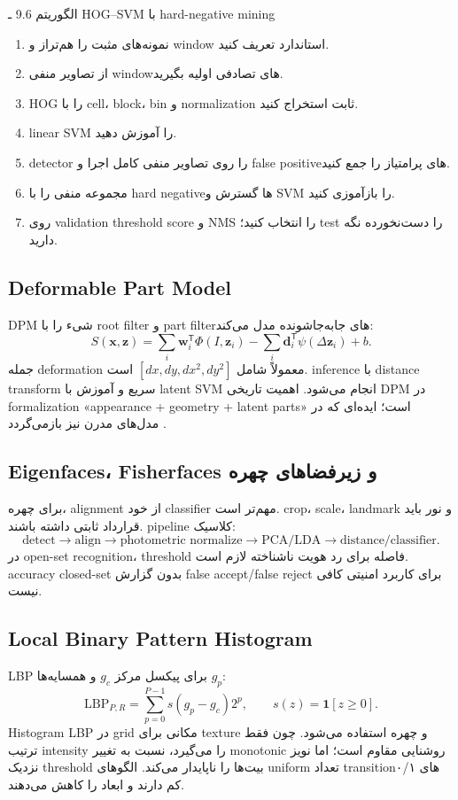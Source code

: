 \documentclass[12pt,openany,oneside]{book}
\newcommand{\trans}{^{\mathsf T}}
\newcommand{\vect}[1]{\bm{#1}}
\begin{document}
\begin{algorithmbox}{الگوریتم 9.6 ـ HOG--SVM با hard-negative mining}
\begin{enumerate}
\item نمونه‌های مثبت را هم‌تراز و window استاندارد تعریف کنید.
\item از تصاویر منفی windowهای تصادفی اولیه بگیرید.
\item HOG را با cell، block، bin و normalization ثابت استخراج کنید.
\item linear SVM را آموزش دهید.
\item detector را روی تصاویر منفی کامل اجرا و false positiveهای پرامتیاز را جمع کنید.
\item مجموعه منفی را با hard negativeها گسترش و SVM را بازآموزی کنید.
\item روی validation threshold score و NMS را انتخاب کنید؛ test را دست‌نخورده نگه دارید.
\end{enumerate}
\end{algorithmbox}

\subsection{Deformable Part Model}
DPM شیء را با root filter و part filterهای جابه‌جاشونده مدل می‌کند:
\begin{equation}
S(\vect x,\vect z)=\sum_i\vect w_i\trans\Phi(I,\vect z_i)-
\sum_i\vect d_i\trans\psi(\Delta\vect z_i)+b.
\end{equation}
جمله deformation معمولاً شامل $[dx,dy,dx^2,dy^2]$ است. inference با distance transform سریع و آموزش با latent SVM انجام می‌شود. اهمیت تاریخی DPM در formalization
«appearance + geometry + latent parts» است؛ ایده‌ای که در مدل‌های مدرن نیز بازمی‌گردد \cite{felzenszwalb2010}.

\subsection{Eigenfaces، Fisherfaces و زیر‌فضاهای چهره}
برای چهره، alignment از خود classifier مهم‌تر است. crop، scale، landmark و نور باید قرارداد ثابتی داشته باشند. pipeline کلاسیک:
\[
\text{detect}\to\text{align}\to\text{photometric normalize}\to\text{PCA/LDA}\to\text{distance/classifier}.
\]
در open-set recognition، threshold فاصله برای رد هویت ناشناخته لازم است. accuracy closed-set بدون گزارش false accept/false reject برای کاربرد امنیتی کافی نیست.

\subsection{Local Binary Pattern Histogram}
LBP برای پیکسل مرکز $g_c$ و همسایه‌ها $g_p$:
\begin{equation}
\mathrm{LBP}_{P,R}=\sum_{p=0}^{P-1}s(g_p-g_c)2^p,
\qquad s(z)=\mathbf1[z\ge0].
\end{equation}
Histogram LBP در grid مکانی برای texture و چهره استفاده می‌شود. چون فقط ترتیب intensity را می‌گیرد، نسبت به تغییر monotonic روشنایی مقاوم است؛ اما نویز نزدیک threshold بیت‌ها را ناپایدار می‌کند. الگوهای uniform تعداد transitionهای ۰/۱ کم دارند و ابعاد را کاهش می‌دهند.
\end{document}
